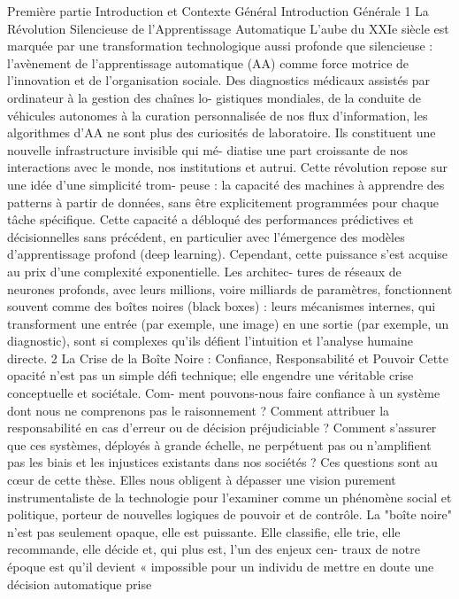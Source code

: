 Première partie
Introduction et Contexte
Général
Introduction Générale
1 La Révolution Silencieuse de
l’Apprentissage Automatique
L’aube du XXIe siècle est marquée par une transformation
technologique aussi profonde que silencieuse : l’avènement
de l’apprentissage automatique (AA) comme force motrice
de l’innovation et de l’organisation sociale. Des diagnostics
médicaux assistés par ordinateur à la gestion des chaînes lo-
gistiques mondiales, de la conduite de véhicules autonomes
à la curation personnalisée de nos flux d’information, les
algorithmes d’AA ne sont plus des curiosités de laboratoire.
Ils constituent une nouvelle infrastructure invisible qui mé-
diatise une part croissante de nos interactions avec le monde,
nos institutions et autrui.
Cette révolution repose sur une idée d’une simplicité trom-
peuse : la capacité des machines à apprendre des patterns
à partir de données, sans être explicitement programmées
pour chaque tâche spécifique. Cette capacité a débloqué des
performances prédictives et décisionnelles sans précédent,
en particulier avec l’émergence des modèles d’apprentissage
profond (deep learning). Cependant, cette puissance s’est
acquise au prix d’une complexité exponentielle. Les architec-
tures de réseaux de neurones profonds, avec leurs millions,
voire milliards de paramètres, fonctionnent souvent comme
des boîtes noires (black boxes) : leurs mécanismes internes,
qui transforment une entrée (par exemple, une image) en
une sortie (par exemple, un diagnostic), sont si complexes
qu’ils défient l’intuition et l’analyse humaine directe.
2 La Crise de la Boîte Noire : Confiance,
Responsabilité et Pouvoir
Cette opacité n’est pas un simple défi technique; elle
engendre une véritable crise conceptuelle et sociétale. Com-
ment pouvons-nous faire confiance à un système dont nous
ne comprenons pas le raisonnement ? Comment attribuer la
responsabilité en cas d’erreur ou de décision préjudiciable ?
Comment s’assurer que ces systèmes, déployés à grande
échelle, ne perpétuent pas ou n’amplifient pas les biais et les
injustices existants dans nos sociétés ?
Ces questions sont au cœur de cette thèse. Elles nous
obligent à dépasser une vision purement instrumentaliste
de la technologie pour l’examiner comme un phénomène
social et politique, porteur de nouvelles logiques de pouvoir
et de contrôle. La "boîte noire" n’est pas seulement opaque,
elle est puissante. Elle classifie, elle trie, elle recommande,
elle décide et, qui plus est, l’un des enjeux cen-
traux de notre époque est qu’il devient « impossible pour un
individu de mettre en doute une décision automatique prise
